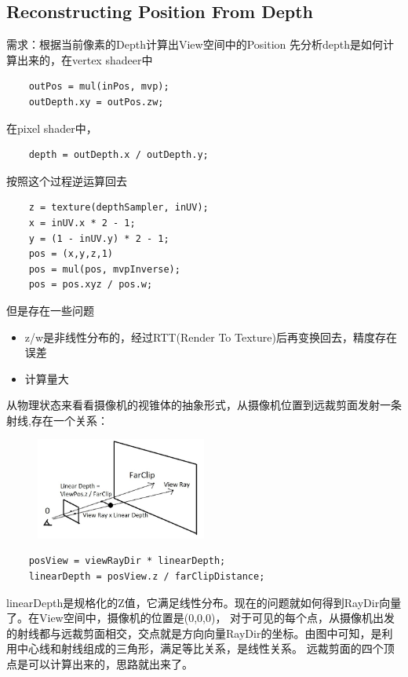 \subsection{Reconstructing Position From Depth}
需求：根据当前像素的Depth计算出View空间中的Position
先分析depth是如何计算出来的，在vertex shadeer中
\begin{lstlisting}
    outPos = mul(inPos, mvp);
    outDepth.xy = outPos.zw;
\end{lstlisting}
在pixel shader中，
\begin{lstlisting}
    depth = outDepth.x / outDepth.y;
\end{lstlisting}
按照这个过程逆运算回去
\begin{lstlisting}
    z = texture(depthSampler, inUV);
    x = inUV.x * 2 - 1;
    y = (1 - inUV.y) * 2 - 1;
    pos = (x,y,z,1)
    pos = mul(pos, mvpInverse);
    pos = pos.xyz / pos.w;
\end{lstlisting}
但是存在一些问题
\begin{itemize}
    \item {z/w是非线性分布的，经过RTT(Render To Texture)后再变换回去，精度存在误差}
    \item {计算量大}
\end{itemize}
从物理状态来看看摄像机的视锥体的抽象形式，从摄像机位置到远裁剪面发射一条射线,存在一个关系：

\begin{figure}[h]
    \centering
    \includegraphics[width=0.5\textwidth]{images/reconstructing-position-from-depth.png}
\end{figure}

\begin{lstlisting}
    posView = viewRayDir * linearDepth;    
    linearDepth = posView.z / farClipDistance;
\end{lstlisting}

linearDepth是规格化的Z值，它满足线性分布。现在的问题就如何得到RayDir向量了。在View空间中，摄像机的位置是(0,0,0)，
对于可见的每个点，从摄像机出发的射线都与远裁剪面相交，交点就是方向向量RayDir的坐标。由图中可知，是利用中心线和射线组成的三角形，满足等比关系，是线性关系。
远裁剪面的四个顶点是可以计算出来的，思路就出来了。

